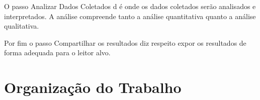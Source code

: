O passo Analizar Dados Coletados d é onde os dados coletados serão analisados e interpretados. A análise compreende tanto a análise quantitativa quanto a análise qualitativa.

Por fim o passo Compartilhar os resultados diz respeito expor os resultados de forma adequada para o leitor alvo.



\section{Organização do Trabalho}
